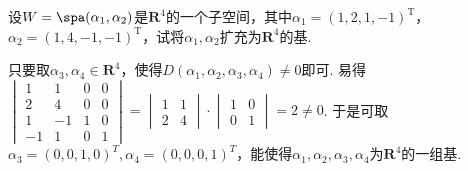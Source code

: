 \begin{exercise}
\begin{exgroup}
        \item 设$W=\spa(\alpha_1,\alpha_2)$是$\mathbf{R}^4$的一个子空间，其中$\alpha_1=(1,2,1,-1)^\mathrm{T}$，$\alpha_2=(1,4,-1,-1)^\mathrm{T}$，试将$\alpha_1,\alpha_2$扩充为$\mathbf{R}^4$的基.
        \begin{answer}
            只要取$\alpha_3,\alpha_4 \in \mathbf{R}^4$，使得$D(\alpha_1,\alpha_2,\alpha_3,\alpha_4) \neq 0$即可. 易得$\begin{vmatrix}
                1  & 1  & 0 & 0 \\
                2  & 4  & 0 & 0 \\
                1  & -1 & 1 & 0 \\
                -1 & 1  & 0 & 1
            \end{vmatrix}=\begin{vmatrix}
                1 & 1 \\
                2 & 4
            \end{vmatrix} \cdot \begin{vmatrix}
                1 & 0 \\
                0 & 1
            \end{vmatrix}=2 \neq 0$. 于是可取$\alpha_3=(0,0,1,0)^T,\alpha_4=(0,0,0,1)^T$，能使得${\alpha_1,\alpha_2,\alpha_3,\alpha_4}$为$\mathbf{R}^4$的一组基.
        \end{answer}


\end{exgroup}
\end{exercise}
